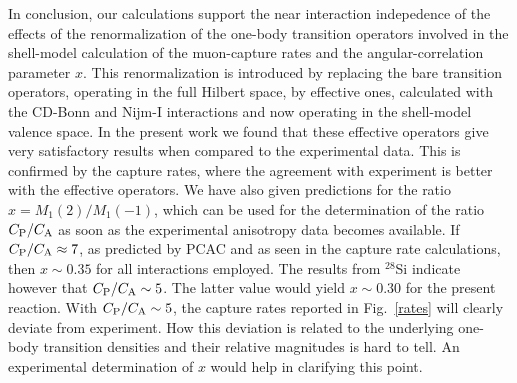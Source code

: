 \documentclass[12pt]{iopart}
\begin{document}
In conclusion, our calculations support the near interaction indepedence of the
effects of the
renormalization of the one-body transition operators involved in the shell-model
calculation of the muon-capture rates and the angular-correlation parameter $x$.
This renormalization is introduced by replacing the bare transition
operators, operating in the full Hilbert space, by effective ones, calculated
with the CD-Bonn and Nijm-I interactions and now 
operating in the shell-model valence space.
In the present work we found that these effective operators give very
satisfactory results when compared to the experimental data. This is
confirmed by the capture rates, where the agreement with experiment is
better with the effective operators. We have also given predictions for the ratio
$x=M_1(2)/M_1(-1)$, which
can be used for the determination of the ratio $C_{\rm P}/C_{\rm A}$ as soon as
the experimental anisotropy data becomes available. If $C_{\rm P}/C_{\rm A}\approx7$,
as predicted by PCAC and as seen in the capture rate
calculations, then $x\sim 0.35$ for all interactions employed. The results from
$^{28}$Si indicate however \cite{bru99,sii99} that $C_{\rm P}/C_{\rm A}\sim 5$.
The latter value would yield $x\sim 0.30$ for
the present reaction. With  $C_{\rm P}/C_{\rm A}\sim 5$,
the capture rates reported in Fig.\ \ref{rates} will clearly deviate
from experiment. How this deviation is related to the underlying one-body
transition densities and their relative magnitudes is hard to tell. An
experimental determination of $x$ would help in clarifying this point.
\end{document}
